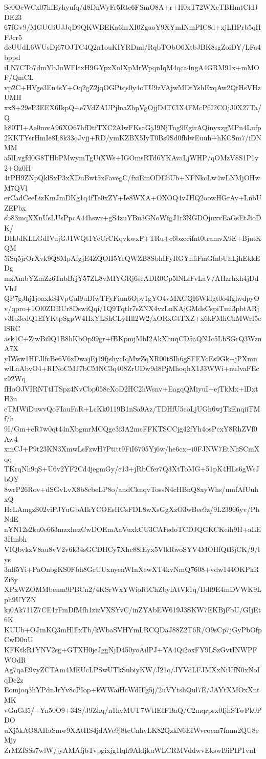 Sc0OcWCx07hfEyhyufq/d8DnWyFr5Rte6FSmO8A+r+H0xT72WXcTBHmtCldJDE23
67fGv9/MGUGiUJJqD9QKWBEKa6hrXI0ZgaoY9XYmINmPIC8d+xjLHPrb5qHFJcr5
dcUUdL6WUsDj67OJTC4Q2n1ouKIYRDml/RqbTObO6XtbJBK8sgZoiDY/LFa4bppd
iLN7CTo7dmYbJuWFlcxH9GYpxXnlXpMrWpqnIqM4qca4ngA4GRM91x+mMOF/QmCL
vp2C+HVge3En4sY+Oq2gZ2jqOGPtqs0y4oTU9zVAjwMDtYshExqAw2QtHsVHzUMH
xx8+29eP3EEX6IkpQ+e7VdZAUPjlnaZhpVgOjjD4TClX4FMcP6I2COjJ0X27Ta/Q
k80TI+Ae0mvA96XO67hfDtfTXC2AlwFKsaGjJ9NjTng9EgirAQinyxzgMPn4Lufp
2KKTYsrHmIe8L8k33oJvjj+RD/ymKZBX5IyT0Bs9Sd0fblwEuuh+hKCSm7/iDNMM
a5lLvgfd0G8THbPMwymTgUiXWs+IGOmsRTd6YKAvaLjWHP/qOMzV8S1P1y2+Oz0H
4tPH9ZNpQklSxP3xXDuBwt5xFavegC/fxiEmODEbUb+NFNkcLw4wLNMjOHwM7QVl
erCadCeeLizKmJmDKg1q4fTe0xZY+Ie8WXA+OXOQ4vJHQ2oowHGrAy+LnbUZEPbx
sb83mqXXnUsLUsPpcA44hswr+gS4zuYBu3GNoWfgJ1r3NGDOjuxvEaGsEtJioDK/
DHJdKLLGdIVujGJ1WQt1YeCrCKqvkwxF+TRu+c6bzccifnt0tramvX9E+BjntKQM
5iSq5jrOrXvk9Q8MpAfgjE4ZQOH5YrQWZB8SbhIFyRGYhfiFmGfnbUhLjhEkkEDg
mzAmbYZmZz6TnbBrjY57ZL8vMIYGRj6seADR0Cp5lNLfFvLaV/AHzrhxh4jDdVhJ
QP7gJhj1joaxkS4VpGal9uDfwTFyFiun6Opy1gYO4vMXGQI6Wldgt0o4fglwdpyO
v/qpro+1Ol0ZDBUr8DswiQqi/1Q9Tqtlr7sZNX4vzLnKAjGMdsCspiTmi3pbtARj
v3Iu3edQ1EfYKtpSgpW4HxYLShCLyHll2W2/xORxGtTXZ+x6kFMhCkMWrI5elSRC
ask1C+ZiwBi9Q1B8hKbOp99gr+fBKpmjMbI2AkXhuqCD5aQNJc5LbSGrQ3WznA7X
yIWsw1HFJlfcBe6V6zDwajEj19fjshycIqMwZqXR00tSIh6gSFEYcEs9Gk+jPXmn
wlLaAbvO4+RINoCMJ7bCMNC3q408ZrUDw9d8PjMhoqhX1J3WWi+nuIvaFEcz92Wq
fHoOJVIRNTtITSpz4NvCbp058eXoD2HC2hWsnv+EagqQMiyuI+ejTkMx+lDxtH3u
eTMWiDuwvQoFIauFaR+LcKk0119B1nSa9Az/TDHfU5coLjUGh6wjTkEnqiiTMf/h
9I/Gm+cR7w0qt44nXbgmrMCQge3f3A2mcFFKTSCCjg42fYh4osPcxY8RhZVf0Aw4
xmCJ+P9t23KN3XmwLsFzwH7Ptitt9FiI6705Yj6w/he6cx+i0FJNW7EtNhSCmXqq
TKrqNh9qS+U6v2YF2Cd4jegmGy/e13+jRbCfer7Q3XtToMG+51pK4HLs6gWsJbOY
8wrP26Rov+dSGvLvX8b8cbeLP8o/andCknqvTossN4cHBnQ8xyWhs/umfAfUuhxQ
HcLAmgzS02viPJYuGbAIkYCOEsHCsFDL8wXsGgXzO3wBee9z/9L23966yv/PhNdE
nYN12s2ku0c663mzxhezCwDOEmAaVuxkCU3CAFsdoTCDJQGKCKeih9H+aLE3Hmbh
VIQbvkzV8au8vV2v6k34sGCDHCy7Xhc88iEyx5VlkRwoSYV4MOHfQtBjCK/9/lys
3nlf5Yi+PaOnbgKS0Fbh8GcUUxnyenWInXewXT4kvNmQ7608+vdw144OKPkRZi8y
XPxWZOMMbenm9PBCn2/4KSrWxYWioRtChZbylAtVk1q/Ddf9E4mDVWK9Lph9UYZN
kj0Ak711Z7CE1rFmDfMfh1zizVXSYvC/inZYAbEW619J3SKW7EKBjFbU/GIjEt6K
KUUb+OJtnKQ3mHlFxTb/kWbaSVHYmLRCQDaJ88Z2T6R/O9sCp7jGyPbOfpCwD0uU
KFKtkR1YNV2sg+GTXH0jeJggNjD450yoAilPJ+YA4Qi2oxFY9LSzGvtINWPFWOdR
Ag7qaE9vyZCTAm4MEUcLPSwUTkSubiyKW/J21o/JYVdLFJMXxNiUfN0xNoIqDe2z
Eomjoq3hYPdnJrYv8cPIop+kWWaiHcWdIFg5j/2uVYtshQul7E/JAYtXMOxXntMK
vGuGd5/+Yn50O9+34S/J9Zhq/n1hyMUT7WtIEIFBaQ/C2mqrpsx0IjhSTwPk0PDO
uXj5kAO8AHaSmw9XAtHS4jdAVe9j8tcCnhvLK82QzkN6EIWvcocm7fmm2QU8eMjy
ZrMZfSSs7wlW/jyAMAfjbTvpgixjg1lqh9AldjkuWLCRMVddwvEkswI9iPIP1vnI

